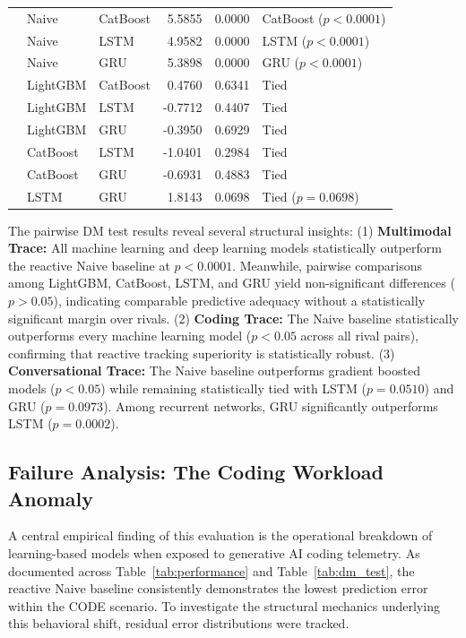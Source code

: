 \documentclass[conference, a4paper]{IEEEtran}
\begin{document}
\begin{table}[htbp]
{\begin{tabular}{lllrrp{2.8cm}}
 & Naive & CatBoost & 5.5855 & 0.0000 & CatBoost ($p<0.0001$) \\
 & Naive & LSTM & 4.9582 & 0.0000 & LSTM ($p<0.0001$) \\
 & Naive & GRU & 5.3898 & 0.0000 & GRU ($p<0.0001$) \\
 & LightGBM & CatBoost & 0.4760 & 0.6341 & Tied \\
 & LightGBM & LSTM & -0.7712 & 0.4407 & Tied \\
 & LightGBM & GRU & -0.3950 & 0.6929 & Tied \\
 & CatBoost & LSTM & -1.0401 & 0.2984 & Tied \\
 & CatBoost & GRU & -0.6931 & 0.4883 & Tied \\
 & LSTM & GRU & 1.8143 & 0.0698 & Tied ($p=0.0698$) \\ \hline
\end{tabular}%
}
\end{table}

The pairwise DM test results reveal several structural insights: (1) \textbf{Multimodal Trace:} All machine learning and deep learning models statistically outperform the reactive Naive baseline at $p < 0.0001$. Meanwhile, pairwise comparisons among LightGBM, CatBoost, LSTM, and GRU yield non-significant differences ($p > 0.05$), indicating comparable predictive adequacy without a statistically significant margin over rivals. (2) \textbf{Coding Trace:} The Naive baseline statistically outperforms every machine learning model ($p < 0.05$ across all rival pairs), confirming that reactive tracking superiority is statistically robust. (3) \textbf{Conversational Trace:} The Naive baseline outperforms gradient boosted models ($p < 0.05$) while remaining statistically tied with LSTM ($p = 0.0510$) and GRU ($p = 0.0973$). Among recurrent networks, GRU significantly outperforms LSTM ($p = 0.0002$).


\subsection{Failure Analysis: The Coding Workload Anomaly}
A central empirical finding of this evaluation is the operational breakdown of learning-based models when exposed to generative AI coding telemetry. As documented across Table~\ref{tab:performance} and Table~\ref{tab:dm_test}, the reactive Naive baseline consistently demonstrates the lowest prediction error within the CODE scenario. To investigate the structural mechanics underlying this behavioral shift, residual error distributions were tracked.
\end{document}
